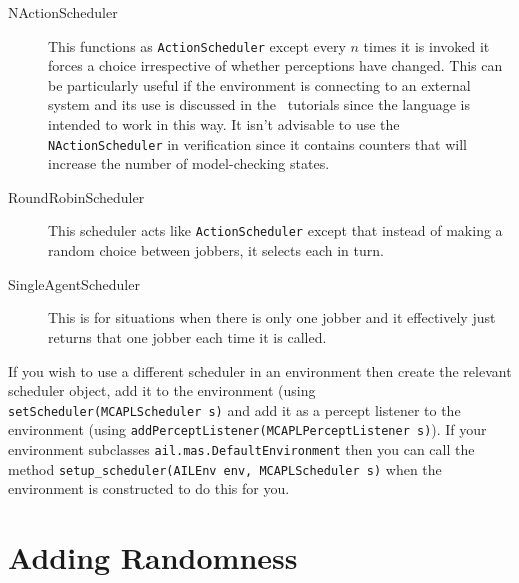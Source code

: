 \begin{description}
\item[NActionScheduler] This functions as \texttt{ActionScheduler} except every $n$ times it is invoked it forces a choice irrespective of whether perceptions have changed.  This can be particularly useful if the environment is connecting to an external system and its use is discussed in the \eass\ tutorials since the language is intended to work in this way.  It isn't advisable to use the \texttt{NActionScheduler} in verification since it contains counters that will increase the number of model-checking states.
\item[RoundRobinScheduler]   This scheduler acts like \texttt{ActionScheduler} except that instead of making a random choice between jobbers, it selects each in turn.
\item[SingleAgentScheduler] This is for situations when there is only one jobber and it effectively just returns that one jobber each time it is called.
\end{description}

\begin{sloppypar}
If you wish to use a different scheduler in an environment then create the relevant scheduler object, add it to the environment (using \texttt{setScheduler(MCAPLScheduler s)} and add it as a percept listener to the environment (using \texttt{addPerceptListener(MCAPLPerceptListener s)}).  If your environment subclasses \texttt{ail.mas.DefaultEnvironment} then you can call the method \texttt{setup\_scheduler(AILEnv env, MCAPLScheduler s)} when the environment is constructed to do this for you.
\end{sloppypar}

\section{Adding Randomness}

